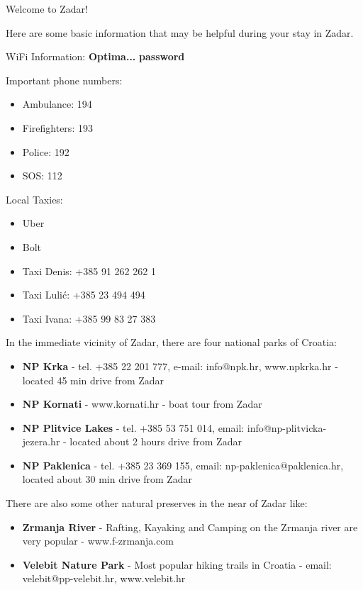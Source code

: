 \documentclass[12pt]{article}
\begin{document}
\begin{center}
\Huge
Welcome to Zadar!
\end{center}
\uwave{\hspace{15cm}}

\large
\vspace{0.5cm}
\noindent
Here are some basic information that may be helpful during your stay in Zadar.


\vspace{0.5cm}
\noindent
WiFi Information: \textbf{Optima...} \textbf{password}
\vspace{0.5cm}

\noindent
\large
Important phone numbers:
\begin{itemize}
\large
\item Ambulance: 194
\item Firefighters: 193
\item Police: 192
\item SOS: 112
\end{itemize}

\vspace{0.5cm}
\noindent
\large
Local Taxies:
\begin{itemize}
\large
\item Uber
\item Bolt
\item Taxi Denis: +385 91 262 262 1
\item Taxi Lulić: +385 23 494 494
\item Taxi Ivana: +385 99 83 27 383
\end{itemize}
\newpage
\noindent
In the immediate vicinity of Zadar, there are four national parks of Croatia:
\begin{itemize}
\large
\item \textbf{NP Krka} - tel. +385 22 201 777, e-mail: info@npk.hr, www.npkrka.hr - located 45 min drive from Zadar
\item \textbf{NP Kornati} - www.kornati.hr - boat tour from Zadar
\item \textbf{NP Plitvice Lakes} - tel. +385 53 751 014, email: info@np-plitvicka-jezera.hr - located about 2 hours drive from Zadar
\item \textbf{NP Paklenica} - tel. +385 23 369 155, email: np-paklenica@paklenica.hr,  located about 30 min drive from Zadar 
\end{itemize}
\noindent
There are also some other natural preserves in the near of Zadar like:
\begin{itemize}
\large
\item \textbf{Zrmanja River} - Rafting, Kayaking and Camping on the Zrmanja river are very popular - www.f-zrmanja.com
\item \textbf{Velebit Nature Park} - Most popular hiking trails in Croatia - email: velebit@pp-velebit.hr, www.velebit.hr
\end{itemize}
\end{document}
